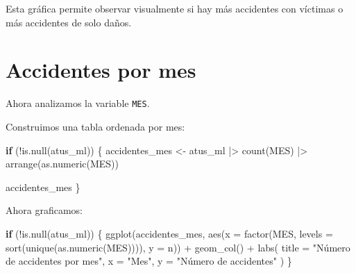 \documentclass[
  11pt,
  letterpaper,
]{book}
\newenvironment{Shaded}{\begin{snugshade}}{\end{snugshade}}
\newcommand{\AttributeTok}[1]{\textcolor[rgb]{0.40,0.45,0.13}{#1}}
\newcommand{\ControlFlowTok}[1]{\textcolor[rgb]{0.00,0.23,0.31}{\textbf{#1}}}
\newcommand{\FunctionTok}[1]{\textcolor[rgb]{0.28,0.35,0.67}{#1}}
\newcommand{\NormalTok}[1]{\textcolor[rgb]{0.00,0.23,0.31}{#1}}
\newcommand{\OtherTok}[1]{\textcolor[rgb]{0.00,0.23,0.31}{#1}}
\newcommand{\SpecialCharTok}[1]{\textcolor[rgb]{0.37,0.37,0.37}{#1}}
\newcommand{\StringTok}[1]{\textcolor[rgb]{0.13,0.47,0.30}{#1}}
\begin{document}
Esta gráfica permite observar visualmente si hay más accidentes con
víctimas o más accidentes de solo daños.

\section{Accidentes por mes}\label{accidentes-por-mes}

Ahora analizamos la variable \texttt{MES}.

\begin{Shaded}
\end{Shaded}

Construimos una tabla ordenada por mes:

\begin{Shaded}
\begin{Highlighting}[]
\ControlFlowTok{if}\NormalTok{ (}\SpecialCharTok{!}\FunctionTok{is.null}\NormalTok{(atus\_ml)) \{}
\NormalTok{  accidentes\_mes }\OtherTok{\textless{}{-}}\NormalTok{ atus\_ml }\SpecialCharTok{|\textgreater{}}
    \FunctionTok{count}\NormalTok{(MES) }\SpecialCharTok{|\textgreater{}}
    \FunctionTok{arrange}\NormalTok{(}\FunctionTok{as.numeric}\NormalTok{(MES))}

\NormalTok{  accidentes\_mes}
\NormalTok{\}}
\end{Highlighting}
\end{Shaded}

Ahora graficamos:

\begin{Shaded}
\begin{Highlighting}[]
\ControlFlowTok{if}\NormalTok{ (}\SpecialCharTok{!}\FunctionTok{is.null}\NormalTok{(atus\_ml)) \{}
  \FunctionTok{ggplot}\NormalTok{(accidentes\_mes, }\FunctionTok{aes}\NormalTok{(}\AttributeTok{x =} \FunctionTok{factor}\NormalTok{(MES, }\AttributeTok{levels =} \FunctionTok{sort}\NormalTok{(}\FunctionTok{unique}\NormalTok{(}\FunctionTok{as.numeric}\NormalTok{(MES)))), }\AttributeTok{y =}\NormalTok{ n)) }\SpecialCharTok{+}
    \FunctionTok{geom\_col}\NormalTok{() }\SpecialCharTok{+}
    \FunctionTok{labs}\NormalTok{(}
      \AttributeTok{title =} \StringTok{"Número de accidentes por mes"}\NormalTok{,}
      \AttributeTok{x =} \StringTok{"Mes"}\NormalTok{,}
      \AttributeTok{y =} \StringTok{"Número de accidentes"}
\NormalTok{    )}
\NormalTok{\}}
\end{Highlighting}
\end{Shaded}
\end{document}
